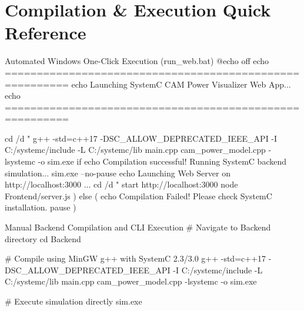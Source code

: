 \documentclass[11pt,a4paper,oneside]{report}
\begin{document}
\appendix
\chapter{Compilation \& Execution Quick Reference}

\begin{codebox}[listing options={language=bash}]{Automated Windows One-Click Execution (run\_web.bat)}
@echo off
echo ========================================================
echo   Launching SystemC CAM Power Visualizer Web App...
echo ========================================================

cd /d "%
g++ -std=c++17 -DSC_ALLOW_DEPRECATED_IEEE_API -I C:/systemc/include -L C:/systemc/lib main.cpp cam_power_model.cpp -lsystemc -o sim.exe
if %
    echo Compilation successful! Running SystemC backend simulation...
    sim.exe --no-pause
    echo Launching Web Server on http://localhost:3000 ...
    cd /d "%
    start http://localhost:3000
    node Frontend/server.js
) else (
    echo Compilation Failed! Please check SystemC installation.
    pause
)
\end{codebox}

\begin{codebox}[listing options={language=bash}]{Manual Backend Compilation and CLI Execution}
# Navigate to Backend directory
cd Backend

# Compile using MinGW g++ with SystemC 2.3/3.0
g++ -std=c++17 -DSC_ALLOW_DEPRECATED_IEEE_API -I C:/systemc/include -L C:/systemc/lib main.cpp cam_power_model.cpp -lsystemc -o sim.exe

# Execute simulation directly
sim.exe
\end{codebox}
\end{document}
